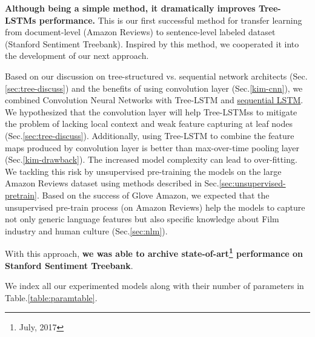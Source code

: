 \begin{description}
\textbf{Although being a simple method, it dramatically improves Tree-LSTMs performance.}
This is our first successful method for transfer learning from document-level (Amazon Reviews) to sentence-level labeled dataset (Stanford Sentiment Treebank).
Inspired by this method, we cooperated it into the development of our next approach.

\item[\deschyperlink{sec:CNNtree}{Combining Recusive Neural Networks with Convolution Neural Networks}] \label{conv-tree-benefits} Based on our discussion on tree-structured vs. sequential network architects (Sec.\ref{sec:tree-discuss}) and the benefits of using convolution layer (Sec.\ref{kim-cnn}), we combined Convolution Neural Networks with Tree-LSTM and \hyperref[sec:lstm]{sequential LSTM}.
We hypothesized that the convolution layer will help Tree-LSTMss to mitigate the problem of lacking local context and weak feature capturing at leaf nodes (Sec.\ref{sec:tree-discuss}).
Additionally, using Tree-LSTM to combine the feature maps produced by convolution layer is better than max-over-time pooling layer (Sec.\ref{kim-drawback}).
The increased model complexity can lead to over-fitting.
We tackling this risk by unsupervised pre-training the models on the large Amazon Reviews dataset using methods described in Sec.\ref{sec:unsupervised-pretrain}.
Based on the success of Glove Amazon, we expected that the unsupervised pre-train process (on Amazon Reviews) help the models to capture not only generic language features but also specific knowledge about Film industry and human culture (Sec.\ref{sec:nlm}).

With this approach, \textbf{we was able to archive state-of-art\footnote{July, 2017} performance on Stanford Sentiment Treebank}.
\end{description}

We index all our experimented models along with their number of parameters in Table.\ref{table:paramtable}.

